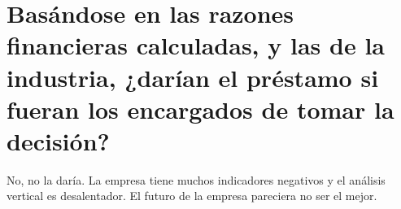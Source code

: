 \section{Basándose en las razones financieras calculadas, y las de la industria, ¿darían el préstamo si fueran los encargados de tomar la decisión?}

No, no la daría. La empresa tiene muchos indicadores negativos y el análisis vertical es desalentador. El futuro de la empresa pareciera no ser el mejor. 


%
%

